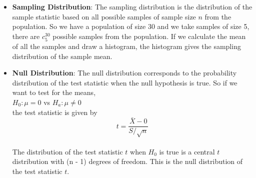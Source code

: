\documentclass[12]{report}
\begin{document}
\begin{itemize}
\item \textbf{Sampling Distribution}: The sampling distribution is the distribution of the sample statistic based on all possible samples of sample size $n$ from the population. So we have a population of size 30 and we take samples of size 5, there are $c^{30}_5$ possible samples from the population. If we calculate the mean of all the samples and draw a histogram, the histogram gives the sampling distribution of the sample mean.
\item \textbf{Null Distribution}: The null distribution corresponds to the probability distribution of the test statistic when the null hypothesis is true. So if we want to test for the means, \\

$H_0: \mu = 0$ vs $H_a: \mu \ne 0$\\

the test statistic is given by \\

$$t=\frac{\bar{X} - 0}{S/\sqrt{n}}$$\\

The distribution of the test statistic $t$ when $H_0$ is true is a central $t$ distribution with (n - 1) degrees of freedom. This is the null distribution of the test statistic $t$.
\end{itemize}
\end{document}
